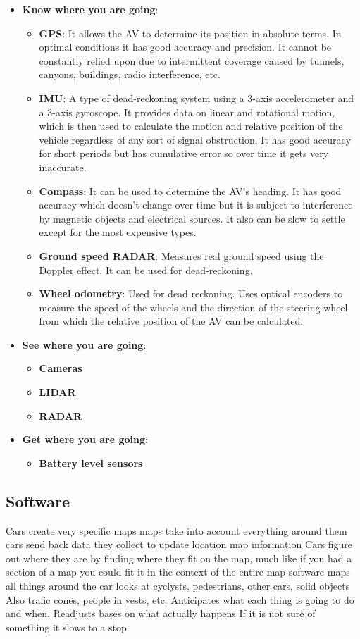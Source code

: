 \documentclass[11pt]{article}
\begin{document}
\begin{itemize}
	\item \textbf{Know where you are going}:
		\begin{itemize}
			\item \textbf{GPS}: It allows the AV to determine its position in absolute terms. In optimal conditions it has good accuracy and precision. It cannot be constantly relied upon due to intermittent coverage caused by tunnels, canyons, buildings, radio interference, etc.
			\item \textbf{IMU}: A type of dead-reckoning system using a 3-axis accelerometer and a 3-axis gyroscope. It provides data on linear and rotational motion, which is then used to calculate the motion and relative position of the vehicle regardless of any sort of signal obstruction. It has good accuracy for short periods but has cumulative error so over time it gets very inaccurate.
			\item \textbf{Compass}: It can be used to determine the AV's heading. It has good accuracy which doesn't change over time but it is subject to interference by magnetic objects and electrical sources. It also can be slow to settle except for the most expensive types.
			\item \textbf{Ground speed RADAR}: Measures real ground speed using the Doppler effect. It can be used for dead-reckoning.
			\item \textbf{Wheel odometry}: Used for dead reckoning. Uses optical encoders to measure the speed of the wheels and the direction of the steering wheel from which the relative position of the AV can be calculated.
		\end{itemize}
	\item \textbf{See where you are going}:
		\begin{itemize}
			\item \textbf{Cameras}
			\item \textbf{LIDAR}
			\item \textbf{RADAR}
		\end{itemize}
	\item \textbf{Get where you are going}:
		\begin{itemize}
			\item \textbf{Battery level sensors}
		\end{itemize}
\end{itemize}

\subsection{Software}
Cars create very specific maps
    maps take into account everything around them
    cars send back data they collect to update location map information
Cars figure out where they are by finding where they fit on the map, much like if you had a section of a map you could fit it in the context of the entire map
software maps all things around the car
looks at cyclysts, pedestrians, other cars, solid objects
Also trafic cones, people in vests, etc. 
Anticipates what each thing is going to do and when. 
Readjusts bases on what actually happens 
If it is not sure of something it slows to a stop
\end{document}
